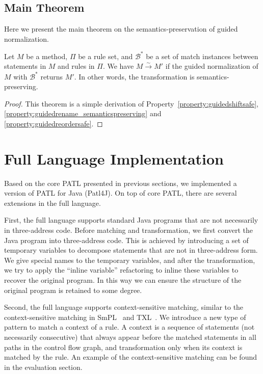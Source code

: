 \documentclass[letterpaper, USenglish]{lipics-v2016}
\newcommand{\PATL}{PATL\xspace}
\theoremstyle{plain}
\begin{document}
\subsection{Main Theorem}

Here we present the main theorem on the semantics-preservation of guided normalization.

\begin{theorem} Let $M$ be a method, $\Pi$ be a rule
  set, and $\mathcal{B}^*$ be a set of match instances between
  statements in $M$ and rules in $\Pi$. We have $M\xrightarrow{\sim}
  M'$ if the guided normalization of $M$ with $\mathcal{B}^*$ returns
  $M'$. In other words, the transformation is semantics-preserving.
\end{theorem}
\begin{proof} This theorem is a simple derivation of
  Property~\ref{property:guidedshiftsafe}, \ref{property:guidedrename_semanticspreserving} and \ref{property:guidedreordersafe}.
\end{proof}



\section{Full Language Implementation}\label{sec:implementation}
Based on the core \PATL presented in previous sections, we implemented
a version of \PATL for Java (Patl4J). On top of core \PATL, there
are several extensions in the full language.

First, the full language supports standard Java programs that are not
necessarily in three-address code. Before matching and transformation,
we first convert the Java program into three-address code. This is
achieved by introducing a set of temporary variables to decompose
statements that are not in three-address form. We give special names
to the temporary variables, and after the transformation, we try to
apply the ``inline variable'' refactoring to inline these variables to
recover the original program. In this way we can ensure the structure
of the original program is retained to some degree.

Second, the full language supports context-sensitive matching, similar
to the context-sensitive matching in
SmPL~\cite{DBLP:conf/eurosys/PadioleauLHM08} and TXL~\cite{Cordy:2006:TST:1149670.1149672}. We
introduce a new type of pattern to match a context of a rule. A
context is a sequence of statements (not necessarily consecutive) that
always appear before the matched statements in all paths in the
control flow graph, and transformation only when its
context is matched by the rule. An example of the context-sensitive matching can be found in the
evaluation section.
\end{document}
